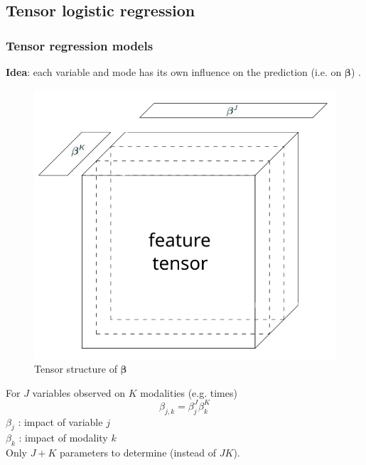 \documentclass{beamer}
\begin{document}
\subsection{Tensor logistic regression}
\begin{frame}
    \frametitle{Tensor regression models}
    \textbf{Idea}: each variable and mode has its own influence on the prediction (i.e. on $\bm{\beta}$) \cite{multi_rank_1}.\\[10 pt]
    \begin{overprint}
    \begin{figure}
        \centering
        \includegraphics[scale = 0.3]{images/beta_tens.png}
        \caption{Tensor structure of $\bm{\beta}$}
    \end{figure}
    \vspace{10 pt}
    For $J$ variables observed on $K$ modalities (e.g. times)
    $$\beta_{j,k} = \beta_j^J\beta_{k}^{K}$$
    $\beta_j$ : impact of variable $j$\\[5 pt]
    $\beta_k$ : impact of modality $k$\\[10 pt]
    Only $J+K$ parameters to determine (instead of $JK$).
    
\end{overprint}
\end{frame}
\end{document}
